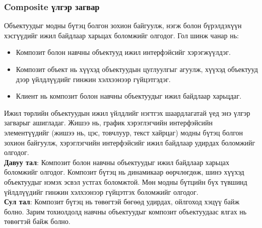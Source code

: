 \subsubsection{Composite үлгэр загвар}
\quad \quad Объектуудыг модны бүтэц болгон зохион байгуулж,	 нэгж болон бүрэлдэхүүн хэсгүүдийг ижил байдлаар харьцах боломжийг олгодог. Гол шинж чанар нь:
\begin{itemize}
	\item Композит болон навчны объектууд ижил интерфэйсийг хэрэгжүүлдэг.
	\item Композит объект нь хүүхэд объектуудын цуглуулгыг агуулж, хүүхэд объектууд дээр үйлдлүүдийг гинжин хэлхээнээр гүйцэтгэдэг.
	\item Клиент нь композит болон навчны объектуудыг ижил байдлаар харьцдаг.
\end{itemize}
Ижил төрлийн объектуудын ижил үйлдлийг нэгтгэх шаардлагатай үед энэ үлгэр загварыг ашигладаг. Жишээ нь, график хэрэглэгчийн интерфэйсийн элементүүдийг (жишээ нь, цэс, товчлуур, текст хайрцаг) модны бүтэц болгон зохион байгуулж, хэрэглэгчийн интерфэйсийг ижил байдлаар удирдах боломжийг олгодог.\\	
\textbf{Давуу тал}: Композит болон навчны объектуудыг ижил байдлаар харьцах боломжийг олгодог. Композит бүтэц нь динамикаар өөрчлөгдөж, шинэ хүүхэд объектуудыг нэмэх эсвэл устгах боломжтой. Мөн модны бүтцийн бүх түвшинд үйлдлүүдийг гинжин хэлхээнээр гүйцэтгэх боломжийг олгодог.\\
\textbf{Сул тал}: Композит бүтэц нь төвөгтэй бөгөөд удирдах, ойлгоход хэцүү байж болно. Зарим тохиолдолд навчны объектуудыг композит объектуудаас ялгах нь төвөгтэй байж болно.	

